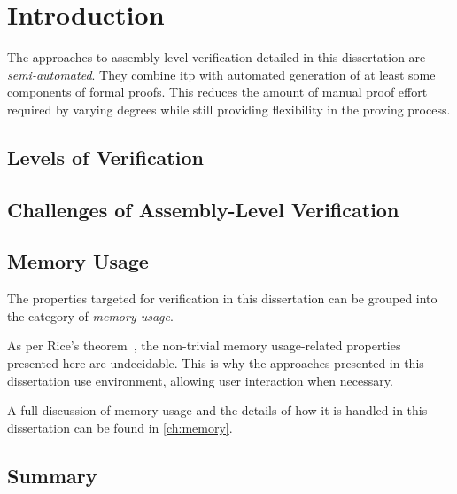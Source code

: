 \chapter{Introduction}

The approaches to assembly-level verification detailed in this dissertation%
are \emph{semi-automated}.
They combine \ac{itp} with automated generation
of at least some components of formal proofs.
This reduces the amount of manual proof effort required by varying degrees
while still providing flexibility in the proving process.


\section{Levels of Verification}  
\section{Challenges of Assembly-Level Verification}
\section{Memory Usage}
The properties targeted for verification in this dissertation
can be grouped into the category of \emph{memory usage}.%


As per Rice's theorem~\citep{rice1953classes},
the non-trivial memory usage-related properties presented here are undecidable.
This is why the approaches presented in this dissertation
use  environment, allowing user interaction when necessary.

A full discussion of memory usage
and the details of how it is handled in this dissertation
can be found in \cref{ch:memory}.

\section{Summary}
